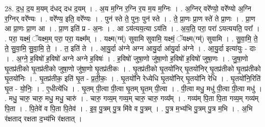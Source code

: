\documentclass[17pt]{extarticle}
\begin{document}
28. द॒ध॒ द॒य म॒यम् द॑धद् दध द॒यम् । . अ॒य म॒ग्नि र॒ग्नि र॒य म॒य म॒ग्निः । . अ॒ग्निर् वरे᳚ण्यो॒ वरे᳚ण्यो अ॒ग्नि र॒ग्निर् वरे᳚ण्यः । . वरे᳚ण्य॒ इति॒ वरे᳚ण्यः । . पुन॑ स्ते ते॒ पुनः॒ पुन॑ स्ते । . ते॒ प्रा॒णः प्रा॒ण स्ते॑ ते प्रा॒णः । . प्रा॒ण आ प्रा॒णः प्रा॒ण आ । . प्रा॒ण इति॑ प्र - अ॒नः । . आ ऽय॑त्यय॒त्या ऽय॑ति । . अ॒य॒ति॒ परा॒ परा॑ ऽयत्ययति॒ परा᳚ । . परा॒ यक्ष्मं॒ ॅयक्ष्म॒म् परा॒ परा॒ यक्ष्म᳚म् । . यक्ष्म(ग्म्॑) सुवामि सुवामि॒ यक्ष्मं॒ ॅयक्ष्म(ग्म्॑) सुवामि । . सु॒वा॒मि॒ ते॒ ते॒ सु॒वा॒मि॒ सु॒वा॒मि॒ ते॒ । . त॒ इति॑ ते । . आ॒यु॒र्दा अ॑ग्ने अग्न आयु॒र्दा आ॑यु॒र्दा अ॑ग्ने । . आ॒यु॒र्दा इत्या॑युः - दाः । . अ॒ग्ने॒ ह॒विषो॑ ह॒विषो॑ अग्ने अग्ने ह॒विषः॑ । . ह॒विषो॑ जुषा॒णो जु॑षा॒णो ह॒विषो॑ ह॒विषो॑ जुषा॒णः । . जु॒षा॒णो घृ॒तप्र॑तीको घृ॒तप्र॑तीको जुषा॒णो जु॑षा॒णो घृ॒तप्र॑तीकः । . घृ॒तप्र॑तीको घृ॒तयो॑निर् घृ॒तयो॑निर् घृ॒तप्र॑तीको घृ॒तप्र॑तीको घृ॒तयो॑निः । . घृ॒तप्र॑तीक॒ इति॑ घृ॒त - प्र॒ती॒कः॒ । . घृ॒तयो॑नि रेध्येधि घृ॒तयो॑निर् घृ॒तयो॑नि रेधि । . घृ॒तयो॑नि॒रिति॑ घृ॒त - यो॒निः॒ । . ए॒धीत्ये॑धि । . घृ॒तम् पी॒त्वा पी॒त्वा घृ॒तम् घृ॒तम् पी॒त्वा । . पी॒त्वा मधु॒ मधु॑ पी॒त्वा पी॒त्वा मधु॑ । . मधु॒ चारु॒ चारु॒ मधु॒ मधु॒ चारु॑ । . चारु॒ गव्य॒म् गव्य॒म् चारु॒ चारु॒ गव्य᳚म् । . गव्य॑म् पि॒ता पि॒ता गव्य॒म् गव्य॑म् पि॒ता । . पि॒तेवे॑ व पि॒ता पि॒तेव॑ । . इ॒व॒ पु॒त्रम् पु॒त्र मि॑वे व पु॒त्रम् । . पु॒त्र म॒भ्य॑भि पु॒त्रम् पु॒त्र म॒भि । . अ॒भि र॑क्षताद् रक्षता द॒भ्य॑भि र॑क्षतात् । \newline
\end{document}
